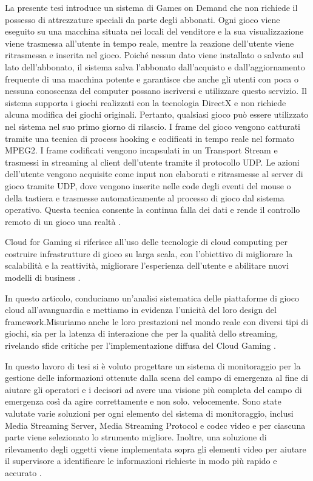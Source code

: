 La presente tesi introduce un sistema di Games on Demand che non richiede il possesso di attrezzature speciali da parte degli abbonati. Ogni gioco viene eseguito su una macchina situata nei locali del venditore e la sua visualizzazione viene trasmessa all'utente in tempo reale, mentre la reazione dell'utente viene ritrasmessa e inserita nel gioco. Poiché nessun dato viene installato o salvato sul lato dell'abbonato, il sistema salva l'abbonato dall'acquisto e dall'aggiornamento frequente di una macchina potente e garantisce che anche gli utenti con poca o nessuna conoscenza del computer possano iscriversi e utilizzare questo servizio. Il sistema supporta i giochi realizzati con la tecnologia DirectX e non richiede alcuna modifica dei giochi originali. Pertanto, qualsiasi gioco può essere utilizzato nel sistema nel suo primo giorno di rilascio. I frame del gioco vengono catturati tramite una tecnica di process hooking e codificati in tempo reale nel formato MPEG2. I frame codificati vengono incapsulati in un Transport Stream e trasmessi in streaming al client dell'utente tramite il protocollo UDP. Le azioni dell'utente vengono acquisite come input non elaborati e ritrasmesse al server di gioco tramite UDP, dove vengono inserite nelle code degli eventi del mouse o della tastiera e trasmesse automaticamente al processo di gioco dal sistema operativo. Questa tecnica consente la continua falla dei dati e rende il controllo remoto di un gioco una realtà \parencite{ARealTimeStreamingGamesonDemandSystem}.

Cloud for Gaming si riferisce all'uso delle tecnologie di cloud computing per costruire infrastrutture di gioco su larga scala, con l'obiettivo di migliorare la scalabilità e la reattività, migliorare l'esperienza dell'utente e abilitare nuovi modelli di business \parencite{Cloud_for_Gaming}.

In questo articolo, conduciamo un'analisi sistematica delle piattaforme di gioco cloud all'avanguardia e mettiamo in evidenza l'unicità del loro design del framework.Misuriamo anche le loro prestazioni nel mondo reale con diversi tipi di giochi, sia per la latenza di interazione che per la qualità dello streaming, rivelando sfide critiche per l'implementazione diffusa del Cloud Gaming \parencite{Cloud_Gaming_Architecture_and_Performance}.

In questo lavoro di tesi si è voluto progettare un sistema di monitoraggio per la gestione delle informazioni ottenute dalla scena del campo di emergenza al fine di aiutare gli operatori e i decisori ad avere una visione più completa del campo di emergenza così da agire correttamente e non solo. velocemente.
Sono state valutate varie soluzioni per ogni elemento del sistema di monitoraggio, inclusi Media Streaming Server, Media Streaming Protocol e codec video e per ciascuna parte viene selezionato lo strumento migliore. Inoltre, una soluzione di rilevamento degli oggetti viene implementata sopra gli elementi video per aiutare il supervisore a identificare le informazioni richieste in modo più rapido e accurato \parencite{CombinedICTTechnologiesforSupervisionofComplexOperationsinResilientCommunities}.

